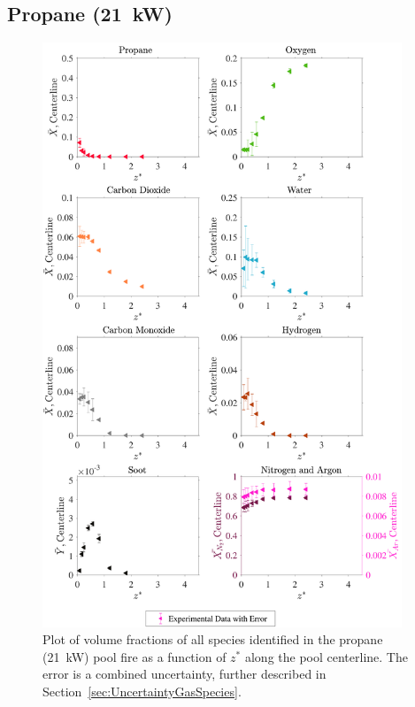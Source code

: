 \documentclass[12pt]{article}
\begin{document}
\subsection{Propane (21~kW)}
\label{ssec:Propane20kW_ALL_Vol_Frac}
\begin{figure}[!h]
	\centering
\includegraphics[width=10.75cm,keepaspectratio]{Propane 21KW_MOL_FRAC_Plot.pdf}
	\caption[Volume fractions of major species in the propane (21~kW) plume]{Plot of volume fractions of all species identified in the propane (21~kW) pool fire as a function of $z^{*}$ along the pool centerline. The error is a combined uncertainty, further described in Section~\ref{sec:UncertaintyGasSpecies}.}
	\label{fig:Propane20kW_VOL_Frac_Major}
\end{figure}
\end{document}
